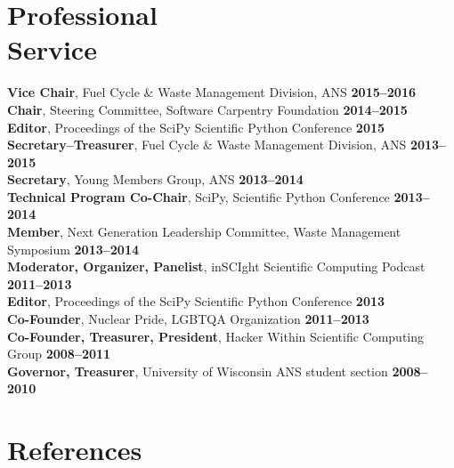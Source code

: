 \documentclass[margin,line]{resume}
\begin{document}
\begin{resume}
    \section{\mysidestyle Professional\\Service}
		\textbf{Vice Chair}, Fuel Cycle \& Waste Management Division, ANS  \hfill \textbf{2015--2016}\vspace{.5mm}\\%
		\textbf{Chair}, Steering Committee, Software Carpentry Foundation   \hfill \textbf{2014--2015}\vspace{.5mm}\\%
		\textbf{Editor}, Proceedings of the SciPy Scientific Python Conference   \hfill \textbf{2015}\vspace{.5mm}\\%
		\textbf{Secretary--Treasurer}, Fuel Cycle \& Waste Management Division, ANS  \hfill \textbf{2013--2015}\vspace{.5mm}\\%
		\textbf{Secretary}, Young Members Group, ANS  \hfill \textbf{2013--2014}\vspace{.5mm}\\%
		\textbf{Technical Program Co-Chair}, SciPy, Scientific Python Conference   \hfill \textbf{2013--2014}\vspace{.5mm}\\%
		\textbf{Member}, Next Generation Leadership Committee, Waste Management Symposium  \hfill \textbf{2013--2014}\vspace{.5mm}\\%
		\textbf{Moderator, Organizer, Panelist}, inSCIght Scientific Computing Podcast  \hfill \textbf{2011--2013}\vspace{.5mm}\\%
		\textbf{Editor}, Proceedings of the SciPy Scientific Python Conference   \hfill \textbf{2013}\vspace{.5mm}\\%
		\textbf{Co-Founder}, Nuclear Pride, LGBTQA Organization  \hfill \textbf{2011--2013}\vspace{.5mm}\\%
		\textbf{Co-Founder, Treasurer, President}, Hacker Within Scientific Computing Group  \hfill \textbf{2008--2011}\vspace{.5mm}\\%
		\textbf{Governor, Treasurer}, University of Wisconsin ANS student section  \hfill \textbf{2008--2010}\vspace{.5mm}\\%

\section{\mysidestyle References}



\end{resume}
\end{document}
